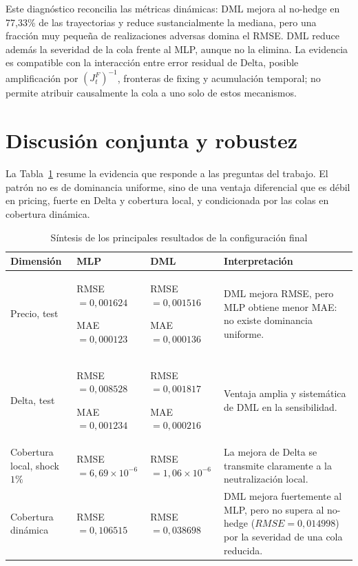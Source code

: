Este diagnóstico reconcilia las métricas dinámicas: DML mejora al no-hedge en 77{,}33\%
de las trayectorias y reduce sustancialmente la mediana, pero una fracción muy pequeña de
realizaciones adversas domina el RMSE. DML reduce además la severidad de la cola frente al
MLP, aunque no la elimina. La evidencia es compatible con la interacción entre error residual
de Delta, posible amplificación por $(J_t^F)^{-1}$, fronteras de fixing y acumulación temporal;
no permite atribuir causalmente la cola a uno solo de estos mecanismos.

\section{Discusión conjunta y robustez}
\label{sec:joint_discussion}

La Tabla~\ref{tab:joint_results_summary} resume la evidencia que responde a las preguntas
del trabajo. El patrón no es de dominancia uniforme, sino de una ventaja diferencial que es
débil en pricing, fuerte en Delta y cobertura local, y condicionada por las colas en cobertura
dinámica.

\begin{table}[htbp]
\centering
\small
\caption{Síntesis de los principales resultados de la configuración final}
\label{tab:joint_results_summary}
\begin{tabular}{>{\raggedright\arraybackslash}p{2.6cm}>{\raggedright\arraybackslash}p{2.8cm}>{\raggedright\arraybackslash}p{2.8cm}>{\raggedright\arraybackslash}p{4.6cm}}
\toprule
\textbf{Dimensión}
& \textbf{MLP}
& \textbf{DML}
& \textbf{Interpretación} \\
\midrule
Precio, test
&
RMSE $=0{,}001624$

MAE $=0{,}000123$
&
RMSE $=0{,}001516$

MAE $=0{,}000136$
&
DML mejora RMSE, pero MLP obtiene menor MAE: no existe dominancia uniforme. \\[1.5mm]
Delta, test
&
RMSE $=0{,}008528$

MAE $=0{,}001234$
&
RMSE $=0{,}001817$

MAE $=0{,}000216$
&
Ventaja amplia y sistemática de DML en la sensibilidad. \\[1.5mm]
Cobertura local, shock $1\%$
&
RMSE $=6{,}69\times10^{-6}$
&
RMSE $=1{,}06\times10^{-6}$
&
La mejora de Delta se transmite claramente a la neutralización local. \\[1.5mm]
Cobertura dinámica
&
RMSE $=0{,}106515$
&
RMSE $=0{,}038698$
&
DML mejora fuertemente al MLP, pero no supera al no-hedge
($RMSE=0{,}014998$) por la severidad de una cola reducida. \\
\bottomrule
\end{tabular}
\end{table}

